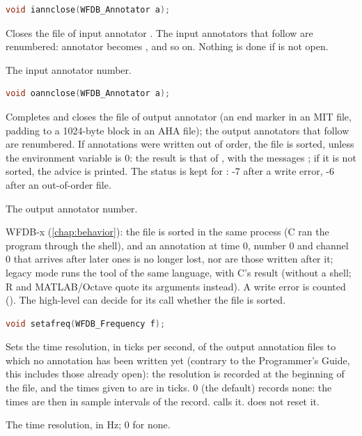 \begin{lstlisting}[language=C,style=signature]
void iannclose(WFDB_Annotator a);
\end{lstlisting}
Closes the file of input annotator . The input annotators that follow
are renumbered: annotator  becomes , and so on. Nothing is
done if  is not open.
\begin{params}
\item[a] The input annotator number.
\end{params}

\begin{lstlisting}[language=C,style=signature]
void oannclose(WFDB_Annotator a);
\end{lstlisting}
Completes and closes the file of output annotator  (an end marker in
an MIT file, padding to a 1024-byte block in an AHA file); the output
annotators that follow are renumbered. If annotations were written out of
order, the file is sorted, unless the environment variable 
is 0: the result is that of , with the messages
; if it is
not sorted, the advice  is
printed. The status is kept for : -7 after a write
error, -6 after an out-of-order file.
\begin{params}
\item[a] The output annotator number.
\end{params}

WFDB-x (\cref{chap:behavior}): the file is sorted in the same process (C ran
the program  through the shell), and an annotation at time 0,
number 0 and channel 0 that arrives after later ones is no longer lost, nor
are those written after it; legacy mode runs the  tool of the
same language, with C's result (without a shell; R and MATLAB/Octave quote
its arguments instead). A write error is counted
(). The high-level  can
decide for its call whether the file is sorted.

\begin{lstlisting}[language=C,style=signature]
void setafreq(WFDB_Frequency f);
\end{lstlisting}
Sets the time resolution, in ticks per second, of the output annotation files
to which no annotation has been written yet (contrary to the Programmer's
Guide, this includes those already open): the resolution is recorded at the
beginning of the file, and the times given to  are in ticks. 0
(the default) records none: the times are then in sample intervals of the
record.  calls it.  does not reset it.
\begin{params}
\item[f] The time resolution, in Hz; 0 for none.
\end{params}

